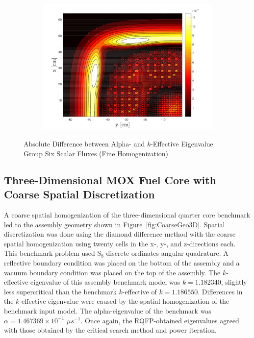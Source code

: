 \begin{figure}[!htbp]
\centering
\begin{subfigure}{\textwidth}
  \centering
  \includegraphics[width=.7\linewidth]{Figures/HigherDimEigen/Alpha_g6_k_g6_FineAbsDiff}
\end{subfigure}
\caption{Absolute Difference between Alpha- and $k$-Effective Eigenvalue Group Six Scalar Fluxes (Fine Homogenization)}
\label{fig:EigScalarFluxDiffFine}
\end{figure}

\subsection{Three-Dimensional MOX Fuel Core with Coarse Spatial Discretization}

A coarse spatial homogenization of the three-dimensional quarter core benchmark led to the assembly geometry shown in Figure~\ref{fig:CoarseGeo3D}. Spatial discretization was done using the diamond difference method with the coarse spatial homogenization using twenty cells in the x-, y-, and z-directions each. This benchmark problem used S$_{8}$ discrete ordinates angular quadrature. A reflective boundary condition was placed on the bottom of the assembly and a vacuum boundary condition was placed on the top of the assembly. The $k$-effective eigenvalue of this assembly benchmark model was $k = 1.182340$, slightly less supercritical than the benchmark $k$-effective of $k = 1.186550$. Differences in the $k$-effective eigenvalue were caused by the spatial homogenization of the benchmark input model. The alpha-eigenvalue of the benchmark was $\alpha = 1.467369 \times 10^{-1}$ $\mu s^{-1}$. Once again, the RQFP-obtained eigenvalues agreed with those obtained by the critical search method and power iteration.

